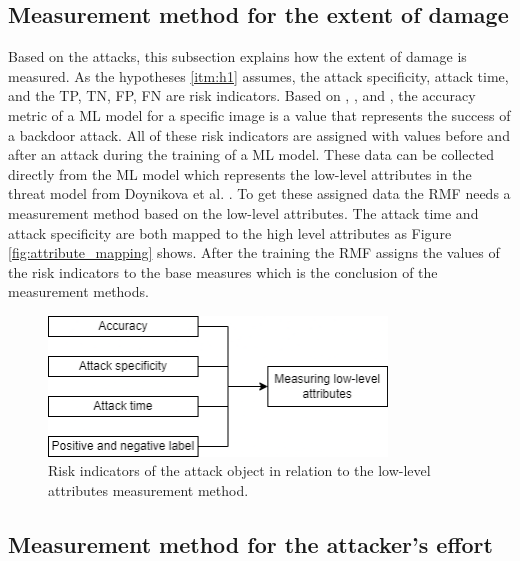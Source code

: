 \subsection{Measurement method for the extent of damage}
\label{sec:ext_dmg}

Based on the attacks, this subsection explains how the extent of damage is measured. As the hypotheses \ref{itm:h1} assumes, the attack specificity, attack time, and the TP, TN, FP, FN are risk indicators. Based on \cite{DBLP:journals/corr/abs-1708-06733}, \cite{turner2018clean}, and \cite{DBLP:journals/corr/abs-1910-00033}, the accuracy metric of a ML model for a specific image is a value that represents the success of a backdoor attack. All of these risk indicators are assigned with values before and after an attack during the training of a ML model. These data can be collected directly from the ML model which represents the low-level attributes in the threat model from Doynikova et al. \cite{DBLP:conf/crisis/DoynikovaNGK20}. To get these assigned data the RMF needs a measurement method based on the low-level attributes. The attack time and attack specificity are both mapped to the high level attributes as Figure \ref{fig:attribute_mapping} shows. After the training the RMF assigns the values of the risk indicators to the base measures which is the conclusion of the measurement methods.

\begin{figure}[ht!]
  \centering
  \includegraphics[width=9cm]{pictures/measure_damage.png}
  \caption{Risk indicators of the attack object in relation to the low-level attributes measurement method.}
  \label{fig:measure_damage}
\end{figure}

\subsection{Measurement method for the attacker's effort}
\label{sec:find_effort}

